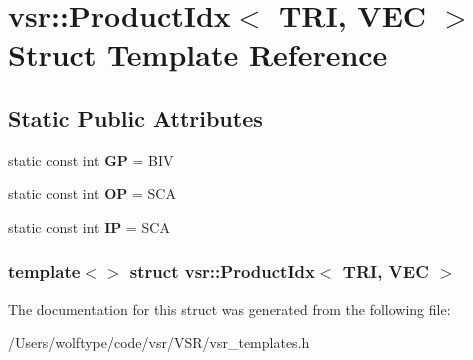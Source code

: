\hypertarget{structvsr_1_1_product_idx_3_01_t_r_i_00_01_v_e_c_01_4}{\section{vsr\-:\-:Product\-Idx$<$ T\-R\-I, V\-E\-C $>$ Struct Template Reference}
\label{structvsr_1_1_product_idx_3_01_t_r_i_00_01_v_e_c_01_4}
}
\subsection*{Static Public Attributes}
\begin{DoxyCompactItemize}
\item 
\hypertarget{structvsr_1_1_product_idx_3_01_t_r_i_00_01_v_e_c_01_4_a214045e221d550faf61ec30f316011df}{static const int {\bfseries G\-P} = B\-I\-V}\label{structvsr_1_1_product_idx_3_01_t_r_i_00_01_v_e_c_01_4_a214045e221d550faf61ec30f316011df}

\item 
\hypertarget{structvsr_1_1_product_idx_3_01_t_r_i_00_01_v_e_c_01_4_a9df004d9b3bae2d2394d5e07d74c3c0f}{static const int {\bfseries O\-P} = S\-C\-A}\label{structvsr_1_1_product_idx_3_01_t_r_i_00_01_v_e_c_01_4_a9df004d9b3bae2d2394d5e07d74c3c0f}

\item 
\hypertarget{structvsr_1_1_product_idx_3_01_t_r_i_00_01_v_e_c_01_4_a35bb1044824ed893b2ce9540dbd9ae8e}{static const int {\bfseries I\-P} = S\-C\-A}\label{structvsr_1_1_product_idx_3_01_t_r_i_00_01_v_e_c_01_4_a35bb1044824ed893b2ce9540dbd9ae8e}

\end{DoxyCompactItemize}
\subsubsection*{template$<$$>$ struct vsr\-::\-Product\-Idx$<$ T\-R\-I, V\-E\-C $>$}



The documentation for this struct was generated from the following file\-:\begin{DoxyCompactItemize}
\item 
/\-Users/wolftype/code/vsr/\-V\-S\-R/vsr\-\_\-templates.\-h\end{DoxyCompactItemize}
